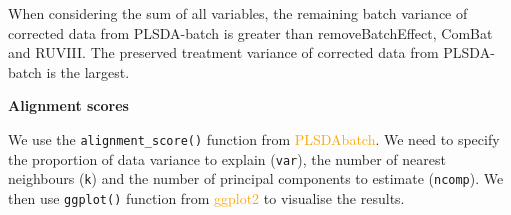 \documentclass[
]{book}
\newenvironment{Shaded}{\begin{snugshade}}{\end{snugshade}}
\newcommand{\AttributeTok}[1]{\textcolor[rgb]{0.77,0.63,0.00}{#1}}
\newcommand{\CommentTok}[1]{\textcolor[rgb]{0.56,0.35,0.01}{\textit{#1}}}
\newcommand{\ControlFlowTok}[1]{\textcolor[rgb]{0.13,0.29,0.53}{\textbf{#1}}}
\newcommand{\DecValTok}[1]{\textcolor[rgb]{0.00,0.00,0.81}{#1}}
\newcommand{\FloatTok}[1]{\textcolor[rgb]{0.00,0.00,0.81}{#1}}
\newcommand{\FunctionTok}[1]{\textcolor[rgb]{0.00,0.00,0.00}{#1}}
\newcommand{\NormalTok}[1]{#1}
\newcommand{\OtherTok}[1]{\textcolor[rgb]{0.56,0.35,0.01}{#1}}
\newcommand{\SpecialCharTok}[1]{\textcolor[rgb]{0.00,0.00,0.00}{#1}}
\begin{document}
When considering the sum of all variables, the remaining batch variance of corrected data from PLSDA-batch is greater than removeBatchEffect, ComBat and RUVIII. The preserved treatment variance of corrected data from PLSDA-batch is the largest.

\textbf{Alignment scores}

We use the \texttt{alignment\_score()} function from \textcolor{orange}{PLSDAbatch}. We need to specify the proportion of data variance to explain (\texttt{var}), the number of nearest neighbours (\texttt{k}) and the number of principal components to estimate (\texttt{ncomp}). We then use \texttt{ggplot()} function from \textcolor{orange}{ggplot2} to visualise the results.

\begin{Shaded}
\end{Shaded}
\end{document}
